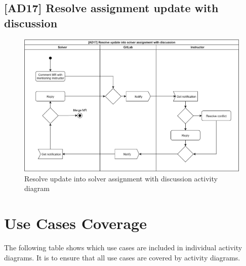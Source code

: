 \subsection{{[}AD17{]} Resolve assignment update with discussion} \label{ssec:ad17}

\begin{figure}[H]
    \centering
    \includegraphics[width=\textwidth,height=\textheight,keepaspectratio]{Figures/ad/ad3.png}
    \caption{Resolve update into solver assignment with discussion activity diagram}
\end{figure}

\section{Use Cases Coverage} \label{sec:ucadc}

The following table shows which use cases are included in individual activity diagrams. It is to ensure that all use cases are covered by activity diagrams.

